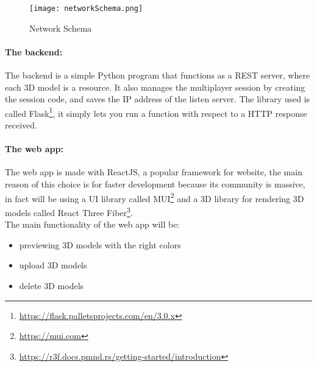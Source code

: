 \begin{figure}[ht]
  \centering
  \texttt{[image: networkSchema.png]}
  \caption{Network Schema}
  \label{fig:NetworkSchema}
\end{figure}


\paragraph{The backend:}
The backend is a simple Python program that functions as a \ac{REST} server, where each 3D model is a resource.
It also manages the multiplayer session by creating the session code, and saves the \ac{IP} address of the listen server.
The library used is called Flask\footnote{\url{https://flask.palletsprojects.com/en/3.0.x}}, it simply lets you run a function with respect to a \ac{HTTP} response received.

\paragraph{The web app:}
The web app is made with ReactJS, a popular framework for website, the main reason of this choice is for faster development because its community is massive, in fact will be using a \ac{UI} library called MUI\footnote{\url{https://mui.com}}
and a 3D library for rendering 3D models called React Three Fiber\footnote{\url{https://r3f.docs.pmnd.rs/getting-started/introduction}}.\\
The main functionality of the web app will be:
\begin{itemize}
  \item previewing 3D models with the right colors 
  \item upload 3D models
  \item delete 3D models
\end{itemize}


